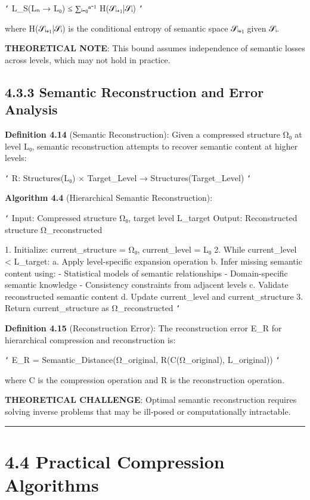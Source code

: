 \texttt{`}
L_S(Lₙ → L₀) ≤ ∑ᵢ₌₀ⁿ⁻¹ H(𝒮ᵢ₊₁|𝒮ᵢ)
\texttt{`}

where H(𝒮ᵢ₊₁|𝒮ᵢ) is the conditional entropy of semantic space 𝒮ᵢ₊₁ given 𝒮ᵢ.

\textbf{THEORETICAL NOTE}: This bound assumes independence of semantic losses across levels, which may not hold in practice.

\subsection{4.3.3 Semantic Reconstruction and Error Analysis}

\textbf{Definition 4.14} (Semantic Reconstruction): Given a compressed structure Ω₀ at level L₀, semantic reconstruction attempts to recover semantic content at higher levels:

\texttt{`}
R: Structures(L₀) × Target_Level → Structures(Target_Level)
\texttt{`}

\textbf{Algorithm 4.4} (Hierarchical Semantic Reconstruction):

\texttt{`}
Input: Compressed structure Ω₀, target level L_target
Output: Reconstructed structure Ω_reconstructed

1. Initialize: current_structure = Ω₀, current_level = L₀
2. While current_level < L_target:
   a. Apply level-specific expansion operation
   b. Infer missing semantic content using:
      - Statistical models of semantic relationships
      - Domain-specific semantic knowledge
      - Consistency constraints from adjacent levels
   c. Validate reconstructed semantic content
   d. Update current_level and current_structure
3. Return current_structure as Ω_reconstructed
\texttt{`}

\textbf{Definition 4.15} (Reconstruction Error): The reconstruction error E_R for hierarchical compression and reconstruction is:

\texttt{`}
E_R = Semantic_Distance(Ω_original, R(C(Ω_original), L_original))
\texttt{`}

where C is the compression operation and R is the reconstruction operation.

\textbf{THEORETICAL CHALLENGE}: Optimal semantic reconstruction requires solving inverse problems that may be ill-posed or computationally intractable.

\hrule

\section{4.4 Practical Compression Algorithms}

